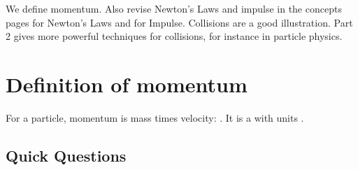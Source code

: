 



\addtolength{\topmargin}{-0.7 cm}
\setlength{\columnsep}{22pt}
\nll
We define momentum.  Also revise Newton's Laws and impulse in the concepts pages for Newton's Laws and for Impulse.  Collisions are a good illustration.  Part 2 gives more powerful techniques for collisions, for instance in particle physics.

\section{Definition of momentum}
For a particle, momentum is mass times velocity: .\nl
It is a  with units .

\subsection{Quick Questions}
\nl
{}
\vspace{-0.5cm}
